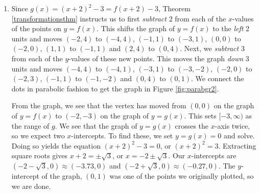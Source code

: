 {
\begin{enumerate}


\item  Since $g(x) = (x+2)^2 - 3 = f(x+2) - 3$, Theorem \ref{transformationsthm} instructs us to first \textit{subtract} $2$ from each of the $x$-values of the points on $y=f(x)$.  This shifts the graph of $y = f(x)$ to the \textit{left} $2$ units and moves $(-2,4)$ to $(-4,4)$, $(-1,1)$ to $(-3,1)$, $(0,0)$ to $(-2,0)$, $(1,1)$ to $(-1,1)$ and $(2,4)$ to $(0,4)$.  Next, we \textit{subtract} $3$ from each of the $y$-values of these new points. This moves the graph \textit{down} $3$ units and moves $(-4,4)$ to $(-4,1)$, $(-3,1)$ to $(-3,-2)$, $(-2,0)$ to $(-2,3)$, $(-1,1)$ to $(-1,-2)$ and $(0,4)$ to $(0,1)$.  We connect the dots in parabolic fashion to get the graph in Figure \ref{fig:parabgr2}.


From the graph, we see that the vertex has moved from $(0,0)$ on the graph of $y = f(x)$ to $(-2,-3)$ on the graph of $y = g(x)$.  This sets $[-3, \infty)$ as the range of $g$.  We see that the graph of $y=g(x)$ crosses the $x$-axis twice, so we expect two $x$-intercepts.  To find these, we set $y = g(x) = 0$ and solve.  Doing so yields the equation $(x+2)^2 - 3 = 0$, or $(x+2)^2 = 3$.  Extracting square roots gives $x + 2 = \pm \sqrt{3}$, or $x = -2 \pm \sqrt{3}$.  Our $x$-intercepts are $(-2-\sqrt{3}, 0) \approx (-3.73, 0)$ and $(-2+\sqrt{3}, 0) \approx (-0.27, 0)$.  The $y$-intercept of the graph, $(0,1)$ was one of the points we originally plotted, so we are done.



\end{enumerate}}
